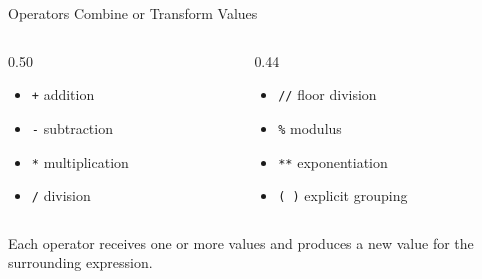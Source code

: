\documentclass[aspectratio=169,10pt]{beamer}
\begin{document}
\begin{frame}{Operators Combine or Transform Values}

  \begin{columns}[T,onlytextwidth]

    \begin{column}{0.50\textwidth}

      \begin{itemize}

        \item \texttt{+} addition

        \item \texttt{-} subtraction

        \item \texttt{*} multiplication

        \item \texttt{/} division

      \end{itemize}

    \end{column}

    \begin{column}{0.44\textwidth}

      \begin{itemize}

        \item \texttt{//} floor division

        \item \texttt{\%} modulus

        \item \texttt{**} exponentiation

        \item \texttt{( )} explicit grouping

      \end{itemize}

    \end{column}

  \end{columns}

  \begin{exampleblockcp}

    Each operator receives one or more values and produces a new value for the surrounding expression.

  \end{exampleblockcp}

\end{frame}
\end{document}
